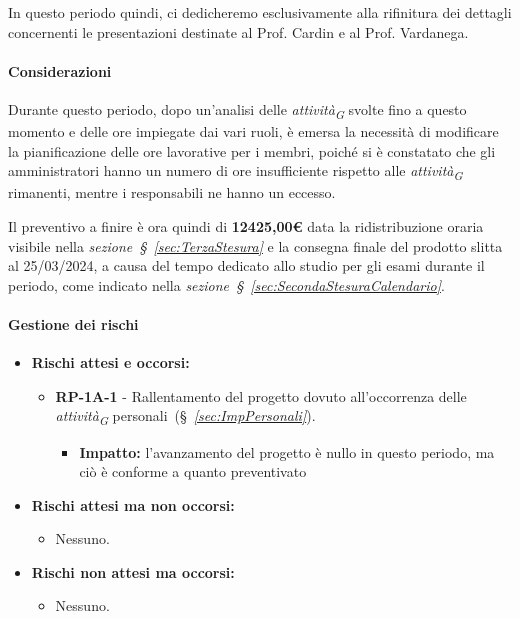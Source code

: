 \vspace{0.2cm}

In questo periodo quindi, ci dedicheremo esclusivamente alla rifinitura dei dettagli concernenti le presentazioni destinate al Prof. Cardin e al Prof. Vardanega.

\paragraph{Considerazioni}
Durante questo periodo, dopo un'analisi delle \textit{attività}\textsubscript{\textit{G}} svolte fino a questo momento e delle ore impiegate dai vari ruoli, è emersa la necessità di modificare la pianificazione delle ore lavorative per i membri, poiché si è constatato che gli amministratori hanno un numero di ore insufficiente rispetto alle \textit{attività}\textsubscript{\textit{G}} rimanenti, mentre i responsabili ne hanno un eccesso.

\vspace{0.2cm}

Il preventivo a finire è ora quindi di \textbf{12425,00€} data la ridistribuzione oraria visibile nella \textit{sezione~\S~\ref{sec:TerzaStesura}} e la consegna finale del prodotto slitta al 25/03/2024, a causa del tempo dedicato allo studio per gli esami durante il periodo, come indicato nella \textit{sezione~\S~\ref{sec:SecondaStesuraCalendario}}. 


\paragraph{Gestione dei rischi} 
\begin{itemize}
    \item \textbf{Rischi attesi e occorsi:}
\begin{itemize}
    \item \textbf{RP-1A-1} - Rallentamento del progetto dovuto all'occorrenza delle \textit{attività}\textsubscript{\textit{G}} personali~(\S~\textit{\ref{sec:ImpPersonali}}).
    \begin{itemize}
        \item \textbf{Impatto:}
       l'avanzamento del progetto è nullo in questo periodo, ma ciò è conforme a quanto preventivato
    \end{itemize}
\end{itemize}
\item \textbf{Rischi attesi ma non occorsi:}
    \begin{itemize}
        \item Nessuno.
    \end{itemize}
    \item \textbf{Rischi non attesi ma occorsi:}
    \begin{itemize}
        \item Nessuno.
    \end{itemize}
\end{itemize}
\newpage
